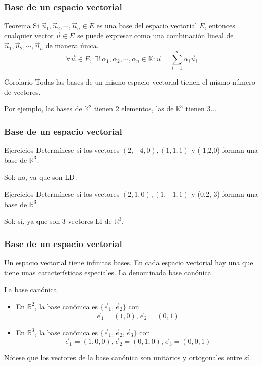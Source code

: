 \documentclass{beamer}
\begin{document}
  
     \begin{frame}
  \frametitle{Base de un espacio vectorial}
  \begin{block}{Teorema}
Si $\vec u_1,\vec u_2,\cdots, \vec u_n\in E$ es una base del espacio vectorial $E$, entonces cualquier vector $\vec u\in E$ se puede expresar como una combinaci\'on lineal de $\vec u_1,\vec u_2,\cdots, \vec u_n$ de manera \'unica. 
\[\forall \vec u \in E,\ \exists!\ \alpha_1,\alpha_2,\cdots,\alpha_n\in \mathbb K : \vec u = \sum_{i=1}^n\alpha_i  \vec u_i\]  
\end{block}
 \begin{block}{Corolario}
Todas las bases de un mismo espacio vectorial tienen el mismo n\'umero de vectores.
\end{block}
Por ejemplo, las bases de $\mathbb K^2$ tienen 2 elementos, las de $\mathbb K^3$ tienen 3...
  \end{frame}
  
    \begin{frame}
  \frametitle{Base de un espacio vectorial}
  \begin{block}{Ejercicios}
Determ\'inese si los vectores $(2,-4,0),(1,1,1)$ y (-1,2,0) forman una base de $\mathbb R^3$.
\end{block}
Sol: no, ya que son LD.

  \begin{block}{Ejercicios}
Determ\'inese si los vectores $(2,1,0),(1,-1,1)$ y (0,2,-3) forman una base de $\mathbb R^3$.
\end{block}
Sol: s\'i, ya que son 3 vectores LI de $\mathbb R^3$.
  \end{frame}
  
  
  
   \begin{frame}
  \frametitle{Base de un espacio vectorial}
  Un espacio vectorial tiene infinitas bases. En cada espacio vectorial hay una que tiene unas caracter\'isticas especiales. La denominada base can\'onica.
  \begin{block}{La base can\'onica}
\begin{itemize}
\item En $\mathbb R^2$, la base can\'onica es $\{\vec e_1,\vec e_2\}$ con \[\vec e_1 = (1,0), \vec e_2 = (0,1)\]
\item En $\mathbb R^3$, la base can\'onica es $\{\vec e_1,\vec e_2,\vec e_3\}$ con \[\vec e_1 = (1,0,0), \vec e_2 = (0,1,0),\vec e_3 = (0,0,1)\]
\end{itemize}
\end{block}
N\'otese que los vectores de la base can\'onica son unitarios y ortogonales entre s\'i.
  \end{frame}
  
\end{document}
